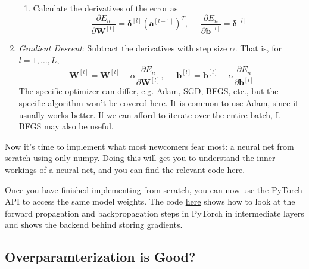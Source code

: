 \begin{algo}
\begin{enumerate}
\begin{enumerate}
        \item Calculate the derivatives of the error as 
        \begin{equation}
          \frac{\partial E_n}{\partial \mathbf{W}^{[l]}} = \boldsymbol{\delta}^{[l]} (\mathbf{a}^{[l-1]})^T, \;\;\;\;\; \frac{\partial E_n}{\partial \mathbf{b}^{[l]}} = \boldsymbol{\delta}^{[l]}
        \end{equation}
      \end{enumerate}
      
      \item \textit{Gradient Descent}: Subtract the derivatives with step size $\alpha$. That is, for $l = 1, \ldots, L$, 
      \begin{equation}
        \mathbf{W}^{[l]} = \mathbf{W}^{[l]} - \alpha \frac{\partial E_n}{\partial \mathbf{W}^{[l]}} , \;\;\;\;\; \mathbf{b}^{[l]} = \mathbf{b}^{[l]} - \alpha \frac{\partial E_n}{\partial \mathbf{b}^{[l]}}
      \end{equation}
      The specific optimizer can differ, e.g. Adam, SGD, BFGS, etc., but the specific algorithm won't be covered here. It is common to use Adam, since it usually works better. If we can afford to iterate over the entire batch, L-BFGS may also be useful. 
    \end{enumerate}
  \end{algo}

  \begin{code}
    Now it's time to implement what most newcomers fear most: a neural net from scratch using only numpy. Doing this will get you to understand the inner workings of a neural net, and you can find the relevant code \href{code/01_MLP/mlp_from_scratch.ipynb}{here}.  
  \end{code} 

  \begin{code}
    Once you have finished implementing from scratch, you can now use the PyTorch API to access the same model weights. The code \href{code/01_MLP/forward_backward.ipynb}{here} shows how to look at the forward propagation and backpropagation steps in PyTorch in intermediate layers and shows the backend behind storing gradients. 
  \end{code}

\subsection{Overparamterization is Good?} 

